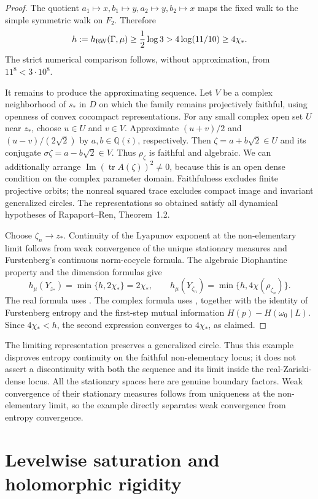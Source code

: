 \documentclass[11pt,letterpaper]{amsart}
\theoremstyle{definition}
\theoremstyle{remark}
\numberwithin{equation}{section}
\begin{document}
\begin{proof}
The quotient
$a_1\mapsto x,b_1\mapsto y,a_2\mapsto y,b_2\mapsto x$
maps the fixed walk to the simple symmetric walk on $F_2$.
Therefore
\[
 h:=h_{\rm RW}(\Gamma,\mu)\ge\frac12\log3
 >4\log(11/10)\ge4\chi_*.
\]
The strict numerical comparison follows, without approximation, from
$11^8<3\cdot10^8$.

It remains to produce the approximating sequence. Let $V$ be a complex
neighborhood of $s_*$ in $D$ on which the family remains projectively
faithful, using openness of convex cocompact representations. For any
small complex open set $U$ near $z_*$, choose $u\in U$ and $v\in V$.
Approximate $(u+v)/2$ and $(u-v)/(2\sqrt2)$ by
$a,b\in\mathbb Q(i)$, respectively. Then
$\zeta=a+b\sqrt2\in U$ and its conjugate
$\sigma\zeta=a-b\sqrt2\in V$. Thus $\rho_\zeta$ is faithful and
algebraic. We can additionally arrange
$\operatorname{Im}(\operatorname{tr}A(\zeta))^2\ne0$, because this
is an open dense condition on the complex parameter domain.
Faithfulness excludes finite projective orbits; the nonreal squared
trace excludes compact image and invariant generalized circles.
The representations so obtained satisfy all dynamical hypotheses of
Rapaport--Ren, Theorem~1.2.

Choose $\zeta_n\to z_*$. Continuity of the Lyapunov exponent at the
non-elementary limit follows from weak convergence of the unique
stationary measures and Furstenberg's continuous norm-cocycle formula.
The algebraic Diophantine property and the dimension formulas give
\[
 h_\mu(Y_{z_*})=\min\{h,2\chi_*\}=2\chi_*,
\qquad
 h_\mu(Y_{\zeta_n})=\min\{h,4\chi(\rho_{\zeta_n})\}.
\]
The real formula uses \cite[Theorems 1.1 and 3.4]{HS}.
The complex formula uses \cite[Theorems 1.2 and 2.14]{RR},
together with the identity of Furstenberg entropy and the first-step
mutual information $H(p)-H(\omega_0\mid L)$. Since $4\chi_*<h$,
the second expression converges to $4\chi_*$, as claimed.
\end{proof}


The limiting representation preserves a generalized circle. Thus this
example disproves entropy continuity on the faithful non-elementary
locus; it does not assert a discontinuity with both the sequence and its
limit inside the real-Zariski-dense locus. All the stationary spaces here
are genuine boundary factors. Weak convergence of their stationary
measures follows from uniqueness at the non-elementary limit, so the
example directly separates weak convergence from entropy convergence.

\section{Levelwise saturation and holomorphic rigidity}
\label{sec:saturation-test}
\end{document}
